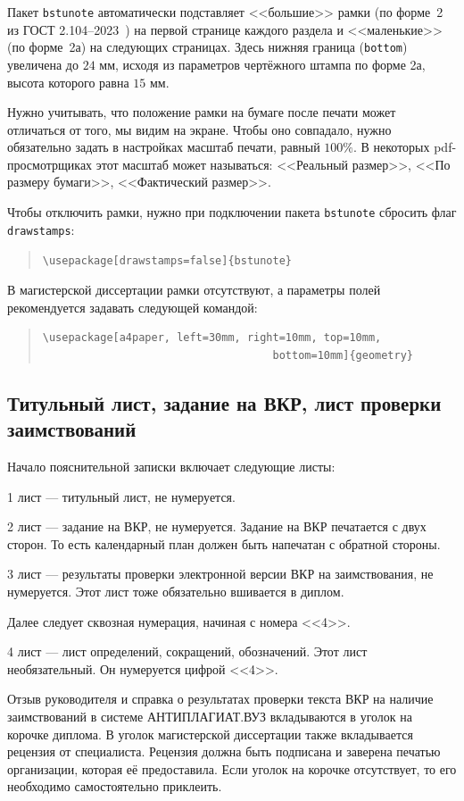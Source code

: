 \documentclass[14pt]{extarticle}
\begin{document}
Пакет \texttt{bstunote} автоматически подставляет <<большие>> рамки (по форме~2 из ГОСТ 2.104--2023~\cite{gost2104}) на первой странице каждого раздела и <<маленькие>> (по форме~2а) на следующих страницах. 
Здесь нижняя граница (\texttt{bottom}) увеличена до $24$ мм, исходя из параметров чертёжного штампа по форме 2а, высота которого равна $15$ мм.

Нужно учитывать, что положение рамки на бумаге после печати может отличаться от того, мы видим на экране. Чтобы оно совпадало, нужно обязательно задать в настройках масштаб печати, равный $100\%$. В некоторых pdf-просмотрщиках этот масштаб может называться: <<Реальный размер>>, <<По размеру бумаги>>, <<Фактический размер>>.

Чтобы отключить рамки, нужно при подключении пакета \texttt{bstunote} сбросить флаг \texttt{drawstamps}:
\begin{quote}
	\small\verb|\usepackage[drawstamps=false]{bstunote}|
\end{quote}

В магистерской диссертации рамки отсутствуют, а параметры полей рекомендуется задавать следующей командой:
\begin{quote}
\small
\begin{verbatim}
\usepackage[a4paper, left=30mm, right=10mm, top=10mm, 
									bottom=10mm]{geometry}
\end{verbatim}
\end{quote}

\subsection{Титульный лист, задание на ВКР, лист проверки заимствований}
Начало пояснительной записки включает следующие листы: 
\par 1 лист --- титульный лист, не нумеруется.
\par 2 лист --- задание на ВКР, не нумеруется. Задание на ВКР печатается с двух сторон. То есть календарный план должен быть напечатан с обратной стороны.
\par 3 лист --- результаты проверки электронной версии ВКР на заимствования, не нумеруется. Этот лист тоже обязательно вшивается в диплом.

\par Далее следует сквозная нумерация, начиная с номера <<4>>.
\par 4 лист --- лист определений, сокращений, обозначений. Этот лист необязательный. Он нумеруется цифрой <<4>>.
\par Отзыв руководителя и справка о результатах проверки текста ВКР на наличие заимствований в системе АНТИПЛАГИАТ.ВУЗ вкладываются в уголок на корочке диплома. В уголок магистерской диссертации также вкладывается рецензия от специалиста. Рецензия должна быть подписана и заверена печатью организации, которая её предоставила. Если уголок на корочке отсутствует, то его необходимо самостоятельно приклеить.
\end{document}
